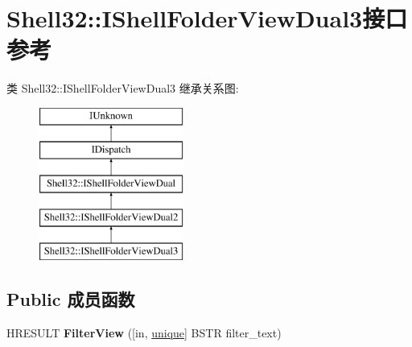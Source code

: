 \hypertarget{interface_shell32_1_1_i_shell_folder_view_dual3}{}\section{Shell32\+:\+:I\+Shell\+Folder\+View\+Dual3接口 参考}
\label{interface_shell32_1_1_i_shell_folder_view_dual3}
类 Shell32\+:\+:I\+Shell\+Folder\+View\+Dual3 继承关系图\+:\begin{figure}[H]
\begin{center}
\leavevmode
\includegraphics[height=5.000000cm]{interface_shell32_1_1_i_shell_folder_view_dual3}
\end{center}
\end{figure}
\subsection*{Public 成员函数}
\begin{DoxyCompactItemize}
\item 
\mbox{\label{interface_shell32_1_1_i_shell_folder_view_dual3_a408eacac4f8713faa5e60e14108470d5}} 
H\+R\+E\+S\+U\+LT {\bfseries Filter\+View} (\mbox{[}in, \hyperlink{interfaceunique}{unique}\mbox{]} B\+S\+TR filter\+\_\+text)
\end{DoxyCompactItemize}
